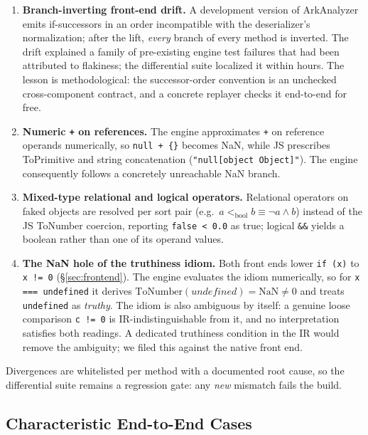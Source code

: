\documentclass[sigconf,nonacm,screen]{acmart}
\begin{document}
\begin{enumerate}
\item \textbf{Branch-inverting front-end drift.} A development version of
  ArkAnalyzer emits if-successors in an order incompatible with the
  deserializer's normalization; after the lift, \emph{every} branch of every
  method is inverted. The drift explained a family of pre-existing engine
  test failures that had been attributed to flakiness; the differential
  suite localized it within hours. The lesson is methodological: the
  successor-order convention is an unchecked cross-component contract, and a
  concrete replayer checks it end-to-end for free.
\item \textbf{Numeric \texttt{+} on references.} The engine approximates
  \lstinline|+| on reference operands numerically, so
  \lstinline|null + {}| becomes NaN, while JS prescribes ToPrimitive and
  string concatenation (\lstinline|"null[object Object]"|). The engine
  consequently follows a concretely unreachable NaN branch.
\item \textbf{Mixed-type relational and logical operators.} Relational
  operators on faked objects are resolved per sort pair
  (e.g.\ $a <_{\mathrm{bool}} b \equiv \lnot a \land b$) instead of the JS
  ToNumber coercion, reporting \lstinline|false < 0.0| as true; logical
  \lstinline|&&| yields a boolean rather than one of its operand values.
\item \textbf{The NaN hole of the truthiness idiom.} Both front ends lower
  \lstinline|if (x)| to \lstinline|x != 0| (\S\ref{sec:frontend}). The
  engine evaluates the idiom numerically, so for
  \lstinline|x === undefined| it derives
  $\mathrm{ToNumber}(\mathit{undefined}) = \mathrm{NaN} \neq 0$ and treats
  \lstinline|undefined| as \emph{truthy}. The idiom is also ambiguous by
  itself: a genuine loose comparison \lstinline|c != 0| is
  IR-indistinguishable from it, and no interpretation satisfies both
  readings. A dedicated truthiness condition in the IR would remove the
  ambiguity; we filed this against the native front end.
\end{enumerate}

Divergences are whitelisted per method with a documented root cause, so the
differential suite remains a regression gate: any \emph{new} mismatch fails
the build.

\subsection{Characteristic End-to-End Cases}
\label{sec:cases}
\end{document}

